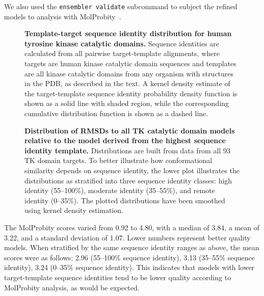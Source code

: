 \documentclass[10pt,letterpaper]{article}
\begin{document}
We also used the {\tt ensembler validate} subcommand to subject the refined models to analysis with MolProbity~\cite{molprobity:2007,molprobity:2010}.
\begin{figure}[h]

    \caption{{\bf Template-target sequence identity distribution for human tyrosine kinase catalytic domains.}
    Sequence identities are calculated from all pairwise target-template alignments, where targets are human kinase catalytic domain sequences and templates are all kinase catalytic domains from any organism with structures in the PDB, as described in the text.
    A kernel density estimate of the target-template sequence identity probability density function is shown as a solid line with shaded region, while the corresponding cumulative distribution function is shown as a dashed line.
    }
  \label{figure:sequence-identity-distribution}
\end{figure}

\begin{figure}[h]


    \caption{{\bf Distribution of RMSDs to all TK catalytic domain models relative to the model derived from the highest sequence identity template.}    
    Distributions are built from data from all 93 TK domain targets.
    To better illustrate how conformational similarity depends on sequence identity, the lower plot illustrates the distributions as stratified into three sequence identity classes: high identity (55--100\%), moderate identity (35--55\%), and remote identity (0--35\%).
    The plotted distributions have been smoothed using kernel density estimation.
  }
  \label{figure:rmsd-distributions}
\end{figure}

The MolProbity scores varied from 0.92 to 4.80, with a median of 3.84, a mean of 3.22, and a standard deviation of 1.07.
Lower numbers represent better quality models.
When stratified by the same sequence identity ranges as above, the mean scores were as follows: 2.96 (55--100\% sequence identity), 3.13 (35--55\% sequence identity), 3.24 (0--35\% sequence identity).
This indicates that models with lower target-template sequence identities tend to be lower quality according to MolProbity analysis, as would be expected.
\end{document}
